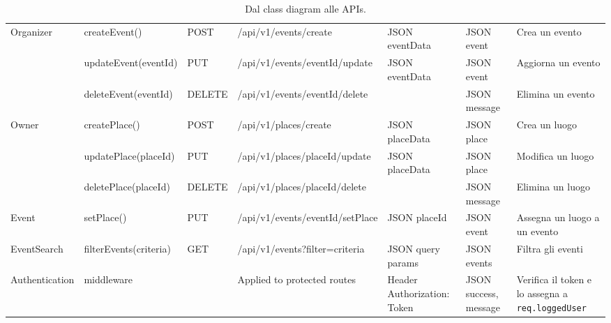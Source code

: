 \documentclass[9pt]{extarticle}
\begin{document}
\begin{table}[!htb]
{\begin{tabular}{lllllll}
	
	Organizer       
	& createEvent()                        & POST        & /api/v1/events/create                 & JSON {eventData}               & JSON {event}                     & Crea un evento \\
	& updateEvent(eventId)                 & PUT         & /api/v1/events/{eventId}/update         & JSON {eventData}               & JSON {event}                     & Aggiorna un evento \\
	& deleteEvent(eventId)                 & DELETE      & /api/v1/events/{eventId}/delete          &  & JSON {message}                   & Elimina un evento \\ \midrule
	
	Owner           
	& createPlace()                        & POST        & /api/v1/places/create                  & JSON {placeData}               & JSON {place}                     & Crea un luogo \\
	& updatePlace(placeId)                 & PUT         & /api/v1/places/{placeId}/update        & JSON {placeData}               & JSON {place}                     & Modifica un luogo \\
	& deletePlace(placeId)                 & DELETE      & /api/v1/places/{placeId}/delete          &  & JSON {message}                   & Elimina un luogo \\ \midrule
	
	Event           
	& setPlace()                           & PUT         & /api/v1/events/{eventId}/setPlace    & JSON {placeId}                 & JSON {event}                     & Assegna un luogo a un evento \\
	EventSearch     
	& filterEvents(criteria)               & GET         & /api/v1/events?filter={criteria}  & JSON query params                   & JSON {events}                    & Filtra gli eventi \\ \midrule
	
	Authentication  
	& middleware                &         & Applied to protected routes                &  Header {Authorization: Token}              & JSON {success, message}                     & Verifica il token e lo assegna a \texttt{req.loggedUser} \\\bottomrule
\end{tabular}%
}
\caption{Dal class diagram alle APIs.}
\label{tab:class2API}
\end{table}
\end{document}
